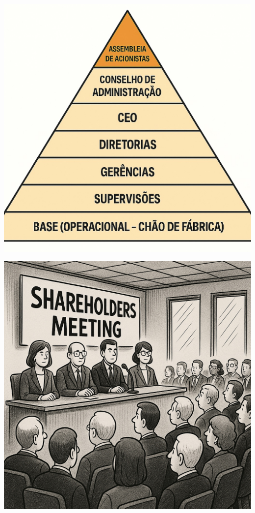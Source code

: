 \documentclass[
]{book}
\begin{document}
\includegraphics[width=5.34375in,height=\textheight]{images/03-2025-08-19_20/00-assembleia_cotistas.jpg}

\includegraphics[width=5.36458in,height=\textheight]{images/03-2025-08-19_20/01-assembleia_cotistas.jpg}
\end{document}
